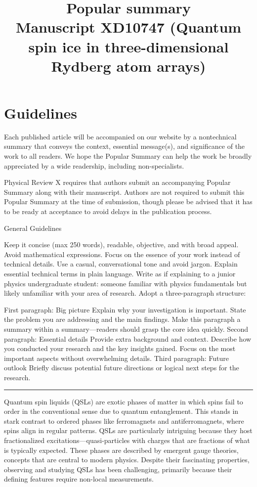 \documentclass[
onecolumn,
superscriptaddress,
longbibliography,
nofootinbib,
 amsmath,amssymb,
 aps,
prb
]{revtex4-2}
\begin{document}
\title{Popular summary \\Manuscript XD10747 (Quantum spin ice in three-dimensional Rydberg atom arrays)}

\maketitle


\section{Guidelines}
Each published article will be accompanied on our website by a nontechnical summary that conveys the context, essential message(s), and significance of the work to all readers. We hope the Popular Summary can help the work be broadly appreciated by a wide readership, including non-specialists.

Physical Review X requires that authors submit an accompanying Popular Summary along with their manuscript. Authors are not required to submit this Popular Summary at the time of submission, though please be advised that it has to be ready at acceptance to avoid delays in the publication process.

General Guidelines

Keep it concise (max 250 words), readable, objective, and with broad appeal.
Avoid mathematical expressions.
Focus on the essence of your work instead of technical details.
Use a casual, conversational tone and avoid jargon. Explain essential technical terms in plain language.
Write as if explaining to a junior physics undergraduate student: someone familiar with physics fundamentals but likely unfamiliar with your area of research.
Adopt a three-paragraph structure:

First paragraph: Big picture
Explain why your investigation is important.
State the problem you are addressing and the main findings.
Make this paragraph a summary within a summary—readers should grasp the core idea quickly.
Second paragraph: Essential details
Provide extra background and context.
Describe how you conducted your research and the key insights gained.
Focus on the most important aspects without overwhelming details.
Third paragraph: Future outlook
Briefly discuss potential future directions or logical next steps for the research.\\

\hrule
\vspace{1cm}

Quantum spin liquids (QSLs) are exotic phases of matter in which spins fail to order in the conventional sense due to  quantum entanglement. This stands in stark contrast to ordered phases like ferromagnets and antiferromagnets, where spins align in regular patterns. QSLs are particularly intriguing because they host fractionalized excitations—quasi-particles with charges that are fractions of what is typically expected. These phases are described by emergent gauge theories, concepts that are central to modern physics. Despite their fascinating properties, observing and studying QSLs has been challenging, primarily because their defining features require non-local measurements.
\end{document}
